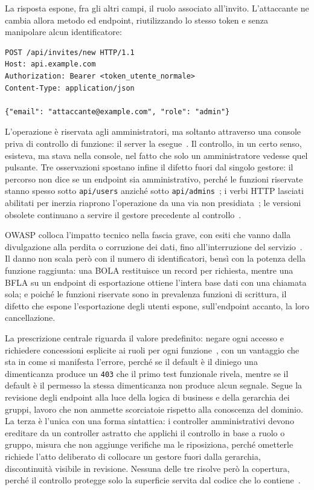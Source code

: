 La risposta espone, fra gli altri campi, il ruolo associato all'invito.
L'attaccante ne cambia allora metodo ed endpoint, riutilizzando lo stesso token
e senza manipolare alcun identificatore:

\begin{verbatim}
POST /api/invites/new HTTP/1.1
Host: api.example.com
Authorization: Bearer <token_utente_normale>
Content-Type: application/json

{"email": "attaccante@example.com", "role": "admin"}
\end{verbatim}

L'operazione è riservata agli amministratori, ma soltanto attraverso una console
priva di controllo di funzione: il server la esegue~\cite{owasp2023api5}. Il
controllo, in un certo senso, esisteva, ma stava nella console, nel fatto che
solo un amministratore vedesse quel pulsante. Tre osservazioni spostano infine
il difetto fuori dal singolo gestore: il percorso non dice se un endpoint sia
amministrativo, perché le funzioni riservate stanno spesso sotto
\texttt{api/users} anziché sotto \texttt{api/admins}~\cite{owasp2023api5}; i
verbi HTTP lasciati abilitati per inerzia riaprono l'operazione da una via non
presidiata~\cite{owasp2023api8}; le versioni obsolete continuano a servire il
gestore precedente al controllo~\cite{owasp2023api9}.

OWASP colloca l'impatto tecnico nella fascia grave, con esiti che vanno dalla
divulgazione alla perdita o corruzione dei dati, fino all'interruzione del
servizio~\cite{owasp2023api5}. Il danno non scala però con il numero di
identificatori, bensì con la potenza della funzione raggiunta: una BOLA
restituisce un record per richiesta, mentre una BFLA su un endpoint di
esportazione ottiene l'intera base dati con una chiamata sola; e poiché le
funzioni riservate sono in prevalenza funzioni di scrittura, il difetto che
espone l'esportazione degli utenti espone, sull'endpoint accanto, la loro
cancellazione.

La prescrizione centrale riguarda il valore predefinito: negare ogni accesso e
richiedere concessioni esplicite ai ruoli per ogni
funzione~\cite{owasp2023api5}, con un vantaggio che sta in come si manifesta
l'errore, perché se il default è il diniego una dimenticanza produce un
\texttt{403} che il primo test funzionale rivela, mentre se il default è il
permesso la stessa dimenticanza non produce alcun segnale. Segue la revisione
degli endpoint alla luce della logica di business e della gerarchia dei gruppi,
lavoro che non ammette scorciatoie rispetto alla conoscenza del dominio. La
terza è l'unica con una forma sintattica: i controller amministrativi devono
ereditare da un controller astratto che applichi il controllo in base a ruolo o
gruppo, misura che non aggiunge verifiche ma le riposiziona, perché ometterle
richiede l'atto deliberato di collocare un gestore fuori dalla gerarchia,
discontinuità visibile in revisione. Nessuna delle
tre risolve però la copertura, perché il controllo protegge solo la superficie
servita dal codice che lo contiene~\cite{owasp2023api9,owasp2023api8}.

